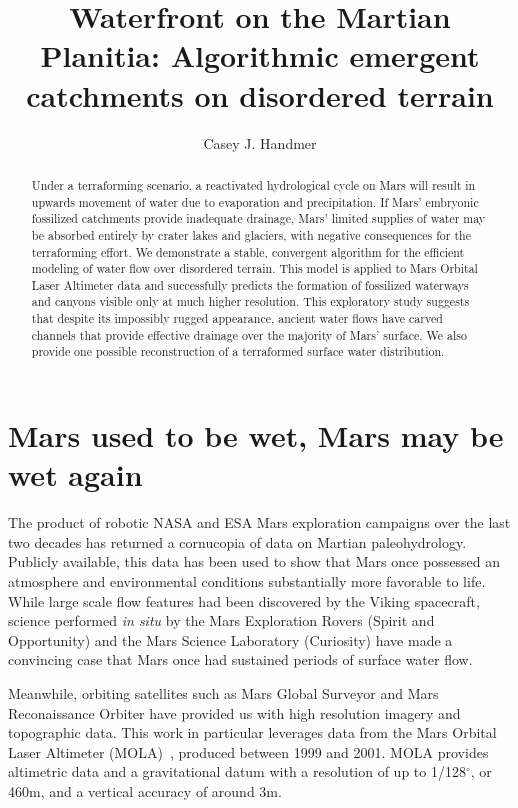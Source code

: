 \documentclass[12pt]{iopart}
\numberwithin{equation}{section}
\begin{document}
\title{Waterfront on the Martian Planitia: Algorithmic emergent catchments on disordered terrain}
\author{Casey J. Handmer}

\begin{abstract}
Under a terraforming scenario, a reactivated hydrological cycle on Mars will result in upwards movement of water due to evaporation and precipitation. If Mars' embryonic fossilized catchments provide inadequate drainage, Mars' limited supplies of water may be absorbed entirely by crater lakes and glaciers, with negative consequences for the terraforming effort. We demonstrate a stable, convergent algorithm for the efficient modeling of water flow over disordered terrain. This model is applied to Mars Orbital Laser Altimeter data and successfully predicts the formation of fossilized waterways and canyons visible only at much higher resolution. This exploratory study suggests that despite its impossibly rugged appearance, ancient water flows have carved channels that provide effective drainage over the majority of Mars' surface. We also provide one possible reconstruction of a terraformed surface water distribution.
\end{abstract}

\section{Mars used to be wet, Mars may be wet again}

The product of robotic NASA and ESA Mars exploration campaigns over the last two decades has returned a cornucopia of data on Martian paleohydrology\cite{marspaleohydrology}. Publicly available, this data has been used to show that Mars once possessed an atmosphere and environmental conditions substantially more favorable to life. While large scale flow features had been discovered by the Viking spacecraft\cite{viking}, science performed {\it in situ} by the Mars Exploration Rovers (Spirit and Opportunity) and the Mars Science Laboratory (Curiosity) have made a convincing case that Mars once had sustained periods of surface water flow\cite{roverfavlife,robinreview}.

Meanwhile, orbiting satellites such as Mars Global Surveyor and Mars Reconaissance Orbiter have provided us with high resolution imagery and topographic data. This work in particular leverages data from the Mars Orbital Laser Altimeter (MOLA)~\cite{MOLA}, produced between 1999 and 2001. MOLA provides altimetric data and a gravitational datum with a resolution of up to 1/128$^{\circ}$, or 460m, and a vertical accuracy of around 3m. 
\end{document}
